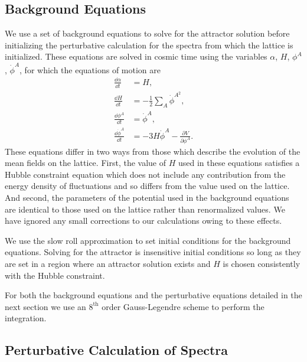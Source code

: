 

\subsection{Background Equations}
We use a set of background equations to solve for the attractor solution before initializing the perturbative calculation for the spectra from which the lattice is initialized. These equations are solved in cosmic time using the variables $\alpha$, $H$, $\phi^A$, $\dot{\phi}^A$, for which the equations of motion are
\begin{align}
  \frac{\dd\alpha}{\dd t} &= H, \\
  \frac{\dd H}{\dd t} &= -\frac{1}{2}\sum_A\dot{\phi}^{A^2}, \\
  \frac{\dd\phi^A}{\dd t} &= \dot{\phi}^A, \\
  \frac{\dd\dot{\phi}^A}{\dd t} &= -3H\dot{\phi}^A - \frac{\partial V}{\partial\phi^A}.
\end{align}
These equations differ in two ways from those which describe the evolution of the mean fields on the lattice. First, the value of $H$ used in these equations satisfies a Hubble constraint equation which does not include any contribution from the energy density of fluctuations and so differs from the value used on the lattice. And second, the parameters of the potential used in the background equations are identical to those used on the lattice rather than renormalized values. We have ignored any small corrections to our calculations owing to these effects.

We use the slow roll approximation to set initial conditions for the background equations. Solving for the attractor is insensitive initial conditions so long as they are set in a region where an attractor solution exists and $H$ is chosen consistently with the Hubble constraint. 

For both the background equations and the perturbative equations detailed in the next section we use an $8^\mathrm{th}$ order Gauss-Legendre scheme to perform the integration.

\subsection{Perturbative Calculation of Spectra}

